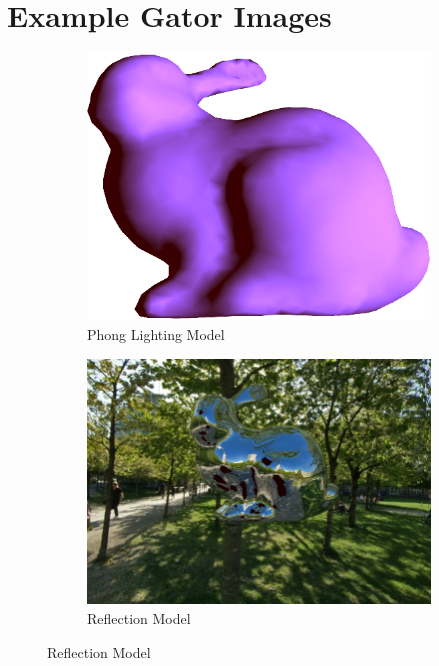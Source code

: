 \documentclass[sigplan,review,anonymous]{acmart}
\begin{document}
{\section{Example Gator Images}
\label{sec:gator-appendix}
\begin{figure}
	\begin{subfigure}{\linewidth}
		\includegraphics[width=\linewidth]{phong.png}
		\caption{Phong Lighting Model}
	\end{subfigure}
	
	\begin{subfigure}{\linewidth}
		\includegraphics[width=\linewidth]{reflection.png}
		\caption{Reflection Model}
	\end{subfigure}
	

\end{figure}}
\end{document}
